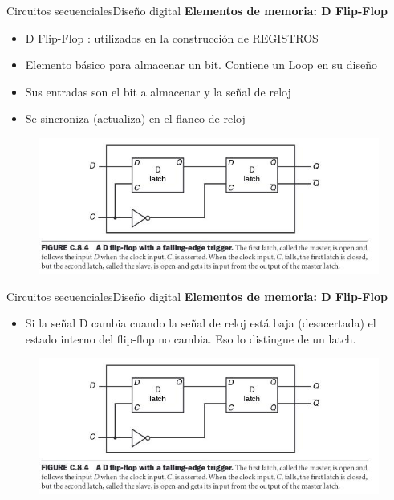 \documentclass[aspectratio=169,compress]{beamer}
\begin{document}
\begin{footnotesize}
\begin{frame}{Circuitos secuenciales}{Diseño digital}
\bigskip
\textbf{Elementos de memoria: D Flip-Flop}
\begin{itemize}
\item D Flip-Flop : utilizados en la construcción de REGISTROS
\item Elemento básico para almacenar un bit. Contiene un Loop en su diseño
\item Sus entradas son el bit a almacenar y la señal de reloj
\item Se sincroniza (actualiza) en el flanco de reloj
\end{itemize}
\bigskip
\begin{figure}
\includegraphics[scale=0.4]{images/flip-flop-d.jpg} 
\end{figure}
\end{frame}

\begin{frame}{Circuitos secuenciales}{Diseño digital}
\bigskip
\textbf{Elementos de memoria: D Flip-Flop}
\begin{itemize}
\item Si la señal D cambia cuando la señal de reloj está baja (desacertada)
el estado interno del flip-flop no cambia. Eso lo distingue de un latch.
\end{itemize}
\bigskip
\begin{figure}
\includegraphics[scale=0.4]{images/flip-flop-d.jpg} 


\end{figure}
\end{frame}
\end{footnotesize}
\end{document}
